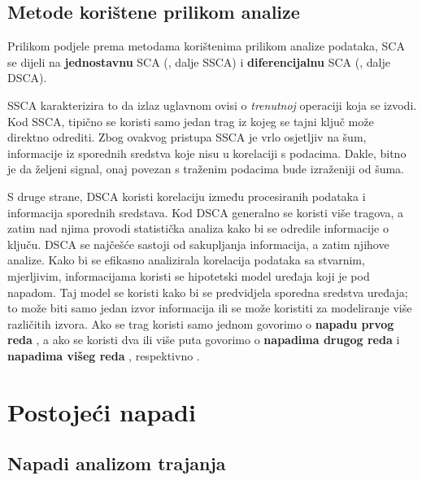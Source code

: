 \documentclass[times, utf8, diplomski]{fer}
\begin{document}
\subsection{Metode korištene prilikom analize}

Prilikom podjele prema metodama korištenima prilikom analize podataka, SCA se dijeli na \textbf{jednostavnu} SCA (, dalje SSCA) i \textbf{diferencijalnu} SCA (, dalje DSCA).

SSCA karakterizira to da izlaz uglavnom ovisi o \emph{trenutnoj} operaciji koja se izvodi. Kod SSCA, tipično se koristi samo jedan trag  iz kojeg se tajni ključ može direktno odrediti. Zbog ovakvog pristupa SSCA je vrlo osjetljiv na šum, informacije iz sporednih sredstva koje nisu u korelaciji s podacima. Dakle, bitno je da željeni signal, onaj povezan s traženim podacima bude izraženiji od šuma.

S druge strane, DSCA koristi korelaciju između procesiranih podataka i informacija sporednih sredstava. Kod DSCA generalno se koristi više tragova, a zatim nad njima provodi statistička analiza kako bi se odredile informacije o ključu. DSCA se najčešće sastoji od sakupljanja informacija, a zatim njihove analize. Kako bi se efikasno analizirala korelacija podataka sa stvarnim, mjerljivim, informacijama koristi se hipotetski model uređaja koji je pod napadom. Taj model se koristi kako bi se predvidjela sporedna sredstva uređaja; to može biti samo jedan izvor informacija ili se može koristiti za modeliranje više različitih izvora. Ako se trag koristi samo jednom govorimo o \textbf{napadu prvog reda} , a ako se koristi dva ili više puta govorimo o \textbf{napadima drugog reda}  i \textbf{napadima višeg reda} , respektivno \citep{zhou2005side}.

\section{Postojeći napadi} \label{sec:known_attacks}

\subsection{Napadi analizom trajanja}
\end{document}
